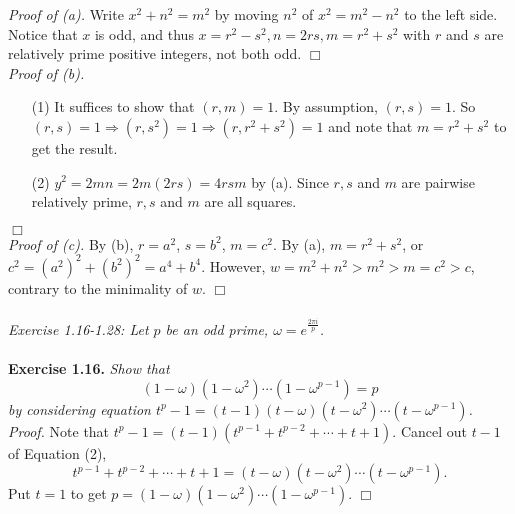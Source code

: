 \documentclass{article}
\begin{document}
\emph{Proof of (a).}
Write $x^2+n^2=m^2$ by moving $n^2$ of $x^2 = m^2-n^2$ to the left side.
Notice that $x$ is odd, and thus
$x=r^2-s^2, n=2rs, m=r^2+s^2$
with $r$ and $s$ are relatively prime positive integers, not both odd.
$\Box$ \\

\emph{Proof of (b).}
\begin{enumerate}
\item[(1)]
It suffices to show that $(r,m) = 1$.
By assumption, $(r,s)=1$.
So
$(r,s) = 1 \Rightarrow (r,s^2) = 1 \Rightarrow (r,r^2+s^2) = 1$
and note that $m=r^2+s^2$ to get the result.
\item[(2)]
$y^2 = 2mn = 2m(2rs) = 4rsm$ by (a).
Since $r,s$ and $m$ are pairwise relatively prime,
$r,s$ and $m$ are all squares.
\end{enumerate}
$\Box$ \\

\emph{Proof of (c).}
By (b), $r=a^2$, $s=b^2$, $m=c^2$.
By (a), $m=r^2+s^2$, or $c^2 = (a^2)^2 + (b^2)^2 = a^4 + b^4$.
However, $w = m^2+n^2 > m^2 > m = c^2 > c$, contrary to the minimality of $w$.
$\Box$ \\\\






\emph{Exercise 1.16-1.28: Let $p$ be an odd prime,
$\omega = e^{\frac{2\pi i}{p}}$.} \\\\



\textbf{Exercise 1.16.}
\emph{Show that
$$(1-\omega)(1-\omega^2) \cdots (1-\omega^{p-1}) = p$$
by considering equation
$t^p - 1 = (t-1)(t-\omega)(t-\omega^2) \cdots (t-\omega^{p-1})$.} \\

\emph{Proof.}
Note that
$t^p - 1 = (t-1)(t^{p-1} + t^{p-2} + \cdots + t + 1)$.
Cancel out $t-1$ of Equation (2),
$$t^{p-1} + t^{p-2} + \cdots + t + 1 = (t-\omega)(t-\omega^2) \cdots (t-\omega^{p-1}).$$
Put $t = 1$ to get
$p = (1-\omega)(1-\omega^2) \cdots (1-\omega^{p-1})$.
$\Box$ \\\\



\end{document}
